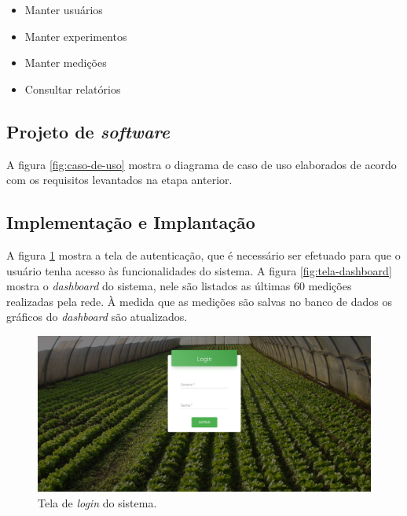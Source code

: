 \begin{itemize}[itemsep=0em]
\item Manter usuários
\item Manter experimentos
\item Manter medições
\item Consultar relatórios
\end{itemize}

\subsection{Projeto de \textit{software}}
A figura \ref{fig:caso-de-uso} mostra o diagrama de caso de uso elaborados de acordo com os requisitos levantados na etapa anterior.

\subsection{Implementação e Implantação}
A figura \ref{fig:tela-login} mostra a tela de autenticação, que é necessário ser efetuado para que o usuário tenha acesso às funcionalidades do sistema. A figura \ref{fig:tela-dashboard} mostra o \textit{dashboard} do sistema, nele são listados as últimas 60 medições realizadas pela rede. À medida que as medições são salvas no banco de dados os gráficos do \textit{dashboard} são atualizados.

\begin{figure}[H]
    \centering
    \includegraphics[scale=0.3]{04-figuras/tela_login.jpg}
    \caption{Tela de \textit{login} do sistema.}
    \vspace{-\baselineskip}
    \label{fig:tela-login}
\end{figure}

